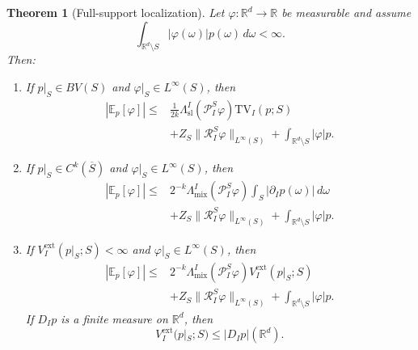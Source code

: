 \documentclass[11pt,letterpaper]{article}
\newtheorem{theorem}{Theorem}[section]
\theoremstyle{definition}
\theoremstyle{remark}
\newcommand{\TV}{\mathrm{TV}}
\begin{document}
\begin{theorem}[Full-support localization]
\label{thm:appendix_full_support_localization}
Let $\varphi:\mathbb R^d\to\mathbb R$ be measurable and assume
$$
\int_{\mathbb R^d\setminus S}|\varphi(\omega)|p(\omega)\,d\omega<\infty.
$$
Then:

\begin{enumerate}
\item[\emph{(i)}] If $p|_S\in BV(S)$ and
$\varphi|_S\in L^\infty(S)$, then
\begin{equation}
\label{eq:appendix_full_support_tv_localization}
\begin{aligned}
|\mathbb E_p[\varphi]|
\le{}&
\frac1{2k}
\Lambda_{\mathrm{sl}}^I(\mathcal P_I^S\varphi)
\TV_I(p;S)
\\
&+
Z_S\|\mathcal R_I^S\varphi\|_{L^\infty(S)}
+
\int_{\mathbb R^d\setminus S}|\varphi|p.
\end{aligned}
\end{equation}

\item[\emph{(ii)}] If $p|_S\in C^k(\overline S)$ and
$\varphi|_S\in L^\infty(S)$, then
\begin{equation}
\label{eq:appendix_full_support_mixed_localization}
\begin{aligned}
|\mathbb E_p[\varphi]|
\le{}&
2^{-k}
\Lambda_{\mathrm{mix}}^I(\mathcal P_I^S\varphi)
\int_S|\partial_Ip(\omega)|\,d\omega
\\
&+
Z_S\|\mathcal R_I^S\varphi\|_{L^\infty(S)}
+
\int_{\mathbb R^d\setminus S}|\varphi|p.
\end{aligned}
\end{equation}

\item[\emph{(iii)}] If $V_I^{\mathrm{ext}}(p|_S;S)<\infty$ and
$\varphi|_S\in L^\infty(S)$, then
\begin{equation}
\label{eq:appendix_full_support_nonsmooth_localization}
\begin{aligned}
|\mathbb E_p[\varphi]|
\le{}&
2^{-k}
\Lambda_{\mathrm{mix}}^I(\mathcal P_I^S\varphi)
V_I^{\mathrm{ext}}(p|_S;S)
\\
&+
Z_S\|\mathcal R_I^S\varphi\|_{L^\infty(S)}
+
\int_{\mathbb R^d\setminus S}|\varphi|p.
\end{aligned}
\end{equation}
If $D_Ip$ is a finite measure on $\mathbb R^d$, then
$$
V_I^{\mathrm{ext}}(p|_S;S)
\le
|D_Ip|(\mathbb R^d).
$$
\end{enumerate}
\end{theorem}
\end{document}
